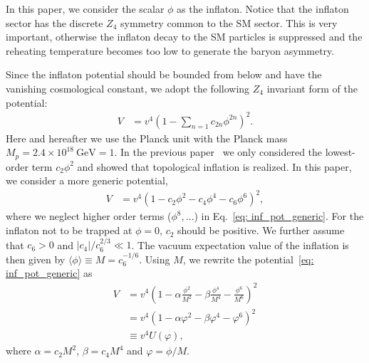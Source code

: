 \documentclass[11pt,a4paper]{article}
\begin{document}
In this paper, we consider the scalar $\phi$ as the inflaton. Notice that the inflaton sector has the discrete $Z_4$ symmetry common to the SM sector. This is very important, otherwise the inflaton decay to the SM particles is suppressed and the reheating temperature becomes too low to generate the baryon asymmetry.

Since the inflaton potential should be bounded from below and have the vanishing cosmological constant, we adopt the following $Z_4$ invariant form of the potential:
\begin{align}
    \label{eq: inf_pot_generic}
    V & =v^4 (1- \sum_{n=1} c_{2n}\phi^{2n} )^2.
\end{align}
Here and hereafter we use the Planck unit with the Planck mass $M_p = 2.4\times 10^{18}~\mathrm{GeV} = 1$.
In the previous paper~\cite{Kawasaki:2023mjm} we only considered the lowest-order term $c_2\phi^2$ and showed that topological inflation is realized.
In this paper, we consider a more generic potential,
\begin{align}
    \label{eq:inf_pot_c}
    V & =v^4 (1- c_2 \phi^2 - c_4 \phi^4 -c_6 \phi^6 )^2,
\end{align}
where we neglect higher order terms ($\phi^8, \ldots$) in Eq.~\eqref{eq: inf_pot_generic}.
For the inflaton not to be trapped at $\phi=0$, $c_2$ should be positive.
We further assume that $c_6> 0$ and $|c_4|/c_6^{2/3} \ll 1$.
The vacuum expectation value of the inflation is then given by $\langle \phi\rangle\equiv M = c_6^{-1/6}$.
Using $M$, we rewrite the potential~\eqref{eq: inf_pot_generic} as
\begin{align}
    \label{eq:inf_pot}
    V & =v^4 \left(1- \alpha \frac{\phi^2}{M^2} 
    - \beta \frac{\phi^4}{M^4} -\frac{\phi^6}{M^6} \right)^2 
    \nonumber\\
    & =  v^4 (1-\alpha \varphi^2 
    - \beta \varphi^4 -\varphi^6)^2
    \nonumber\\
    & \equiv v^4 U(\varphi),
\end{align}
where $\alpha = c_2 M^2$, $\beta = c_4 M^4$ and $\varphi = \phi/M$.
\end{document}
